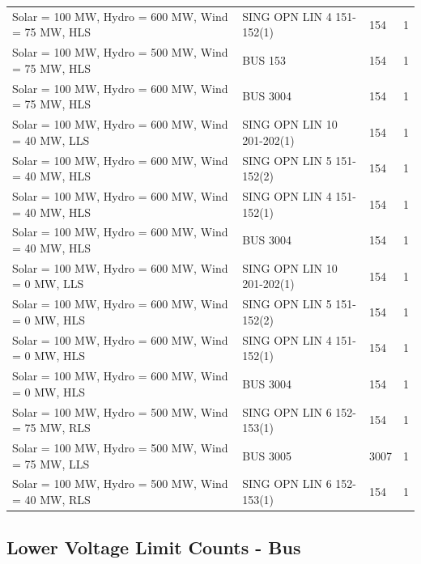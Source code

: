 \documentclass[10pt]{report}
\begin{document}
\begin{table}[H]
{\begin{tabular}{llp{8cm}r}
Solar = 100 MW, Hydro = 600 MW, Wind = 75 MW, HLS & SING OPN LIN   4 151-152(1) & 154 & 1 \\
Solar = 100 MW, Hydro = 500 MW, Wind = 75 MW, HLS & BUS 153 & 154 & 1 \\
Solar = 100 MW, Hydro = 600 MW, Wind = 75 MW, HLS & BUS 3004 & 154 & 1 \\
Solar = 100 MW, Hydro = 600 MW, Wind = 40 MW, LLS & SING OPN LIN   10 201-202(1) & 154 & 1 \\
Solar = 100 MW, Hydro = 600 MW, Wind = 40 MW, HLS & SING OPN LIN   5 151-152(2) & 154 & 1 \\
Solar = 100 MW, Hydro = 600 MW, Wind = 40 MW, HLS & SING OPN LIN   4 151-152(1) & 154 & 1 \\
Solar = 100 MW, Hydro = 600 MW, Wind = 40 MW, HLS & BUS 3004 & 154 & 1 \\
Solar = 100 MW, Hydro = 600 MW, Wind = 0 MW, LLS & SING OPN LIN   10 201-202(1) & 154 & 1 \\
Solar = 100 MW, Hydro = 600 MW, Wind = 0 MW, HLS & SING OPN LIN   5 151-152(2) & 154 & 1 \\
Solar = 100 MW, Hydro = 600 MW, Wind = 0 MW, HLS & SING OPN LIN   4 151-152(1) & 154 & 1 \\
Solar = 100 MW, Hydro = 600 MW, Wind = 0 MW, HLS & BUS 3004 & 154 & 1 \\
Solar = 100 MW, Hydro = 500 MW, Wind = 75 MW, RLS & SING OPN LIN   6 152-153(1) & 154 & 1 \\
Solar = 100 MW, Hydro = 500 MW, Wind = 75 MW, LLS & BUS 3005 & 3007 & 1 \\
Solar = 100 MW, Hydro = 500 MW, Wind = 40 MW, RLS & SING OPN LIN   6 152-153(1) & 154 & 1 \\
\bottomrule
\end{tabular}}
\end{table}


\subsection{Lower Voltage Limit Counts - Bus}
\end{document}
